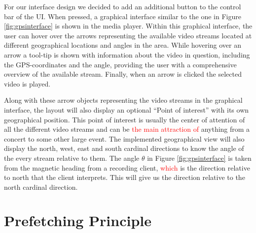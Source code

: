 For our interface design we decided to add an additional button to the control bar of the UI. When pressed, a graphical interface similar to the one in Figure \ref{fig:gpsinterface} is shown in the media player. Within this graphical interface, the user can hover over the arrows representing the available video streams located at different geographical locations and angles in the area. While hovering over an arrow a tool-tip is shown with information about the video in question, including the GPS-coordinates and the angle, providing the user with a comprehensive overview of the available stream. Finally, when an arrow is clicked the selected video is played.

Along with these arrow objects representing the video streams in the graphical interface, the layout will also display an optional “Point of interest” with its own geographical position. This point of interest is usually the center of attention of all the different video streams and can be \textcolor{red}{the main attraction of} anything from a concert to some other large event. The implemented geographical view will also display the north, west, east and south cardinal directions to know the angle of the every stream relative to them. The angle $\theta$ in Figure \ref{fig:gpsinterface} is taken from the magnetic heading from a recording client, \textcolor{red}{which} is the direction relative to north that the client interprets. This will give us the direction relative to the north cardinal direction.

\section{Prefetching Principle}
\label{sec:prefetching}

